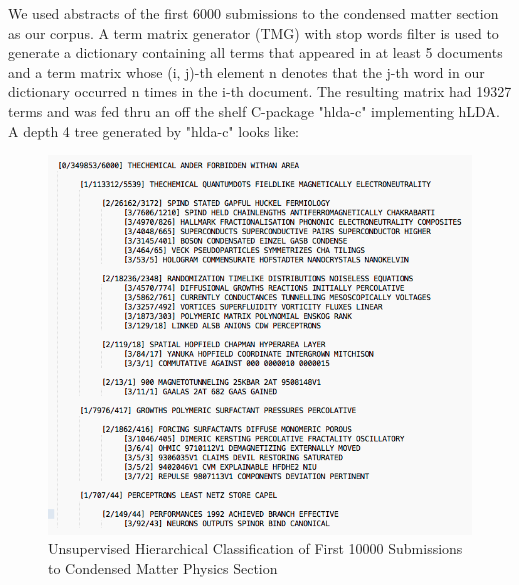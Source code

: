 \documentclass[DIV=calc, paper=a4, fontsize=11pt, twocolumn]{scrartcl}	 %
\begin{document}
We used abstracts of the first 6000 submissions to the condensed matter section as our corpus. A term matrix generator (TMG) \cite{3} with stop words filter is used to generate a dictionary containing all terms that appeared in at least 5 documents and a term matrix whose (i, j)-th element n denotes that the j-th word in our dictionary occurred n times in the i-th document. The resulting matrix had 19327 terms and was fed thru an off the shelf C-package "hlda-c" \cite{1} implementing hLDA.\\
A depth 4 tree generated by "hlda-c" looks like:\newline
			\begin{figure}[!ht]
				\centerline{\includegraphics[scale = 0.35]{tree10000.png}}
				\caption{Unsupervised Hierarchical Classification of First 10000 Submissions to Condensed Matter Physics Section}
			\end{figure}
\newline
\end{document}
